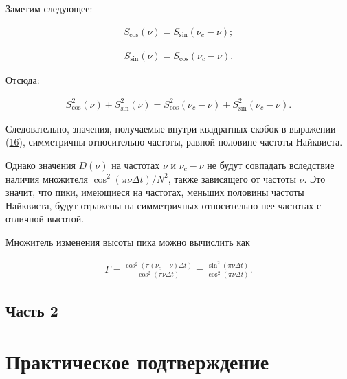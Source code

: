 \documentclass[12pt]{article}
\newcommand{\hl}[1]{(\hyperlink{eq:#1}{#1})}
\newcommand{\s}[2]{\hypertarget{skip:#1}{\vspace{#2pt}}}
\newcommand{\sd}[1]{\hypertarget{skip:#1}{\vspace{-10pt}}}
\newcommand{\hep}[2]{\vspace{#2pt}\hypertarget{eq:#1}{}\vspace{-#2pt}}
\newcommand{\hs}[1]{\sd{#1}\hep{#1}{18}}
\begin{document}
Заметим следующее:

\sd{23}
\begin{gather}
    S_{\cos}(\nu) = S_{\sin}(\nu_{c} - \nu);
\end{gather}

\s{24}{-20}
\begin{gather}
    S_{\sin}(\nu) = S_{\cos}(\nu_{c} - \nu).
\end{gather}

Отсюда:

\hs{25}
\begin{gather}
    S_{\cos}^2(\nu) + S_{\sin}^2(\nu) = S_{\cos}^2(\nu_{c} - \nu) + S_{\sin}^2(\nu_{c} - \nu).
\end{gather}

Следовательно, значения, получаемые внутри квадратных скобок в выражении \hl{16}, симметричны относительно частоты, равной половине частоты Найквиста. \par

\vspace{\baselineskip}

Однако значения $ D(\nu) $ на частотах $ \nu $ и $ \nu_{c} - \nu $ не будут совпадать вследствие наличия множителя $ \cos^2(\pi \nu \Delta t) / N^2 $, также зависящего от частоты $ \nu $. Это значит, что пики, имеющиеся на частотах, меньших половины частоты Найквиста, будут отражены на симметричных относительно нее частотах с отличной высотой. \par

\vspace{\baselineskip}

Множитель изменения высоты пика можно вычислить как

\hs{26}
\begin{gather}
    \Gamma = \frac{\cos^2(\pi (\nu_{c} - \nu) \Delta t) }{\cos^2(\pi \nu \Delta t) } = \frac{\sin^2(\pi \nu \Delta t) }{\cos^2(\pi \nu \Delta t) }.
\end{gather}

\newpage

\subsection*{Часть 2}
\section*{Практическое подтверждение}
\setcounter{section}{2}
\setcounter{subsection}{0}

\vspace{18pt}
\end{document}
